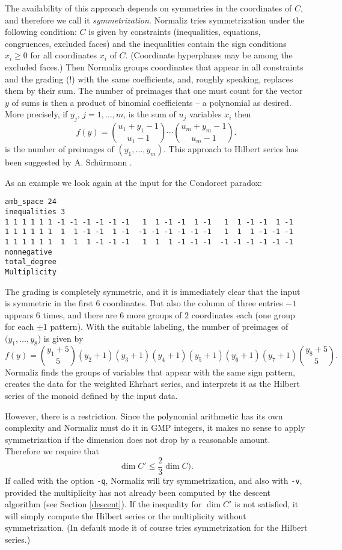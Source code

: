 \documentclass[12pt,a4paper]{scrartcl}
\theoremstyle{definition}
\begin{document}
{The availability of this approach depends on symmetries in the coordinates of $C$, and therefore we call it \emph{symmetrization}. Normaliz tries symmetrization under the following condition: $C$ is given by constraints (inequalities, equations, congruences, excluded faces) and the inequalities contain the sign conditions $x_i\ge 0$ for all coordinates  $x_i$ of $C$. (Coordinate hyperplanes may be among the excluded faces.) Then Normaliz groups coordinates that appear in all constraints and the grading (!) with the same coefficients, and, roughly speaking, replaces them by their sum. The number of preimages that one must count for the vector $y$  of sums is then a product of binomial coefficients -- a polynomial as desired. More precisely, if $y_j$, $j=1,\dots,m$, is the sum of  $u_j$ variables $x_i$ then
$$
f(y)=\binom{u_1+y_1-1}{u_1-1}\cdots \binom{u_m+y_m-1}{u_m-1}.
$$
is the number of preimages of $(y_1,\dots,y_m)$. This approach to Hilbert series has been suggested by A. Sch\"urmann \cite{Sch}.

As an example we look again at the input for the Condorcet paradox:
\begin{Verbatim}
amb_space 24
inequalities 3
1 1 1 1 1 1 -1 -1 -1 -1 -1 -1   1  1 -1 -1  1 -1   1  1 -1 -1  1 -1
1 1 1 1 1 1  1  1 -1 -1  1 -1  -1 -1 -1 -1 -1 -1   1  1  1 -1 -1 -1
1 1 1 1 1 1  1  1  1 -1 -1 -1   1  1  1 -1 -1 -1  -1 -1 -1 -1 -1 -1
nonnegative
total_degree
Multiplicity
\end{Verbatim}
The grading is completely symmetric, and it is immediately clear that the input is symmetric in the first $6$ coordinates. But also the column of three entries $-1$ appears $6$ times, and there are $6$ more groups of $2$ coordinates each (one group for each $\pm1$ pattern). With the suitable labeling, the number of preimages of$(y_1,\dots,y_8$) is given by
$$
f(y)=\binom{y_1+5}{5}(y_2+1)(y_3+1)(y_4+1)(y_5+1)(y_6+1)(y_7+1)\binom{y_8+5}{5}.
$$
Normaliz finds the groups of variables that appear with the same sign pattern, creates the data for the weighted Ehrhart series, and interprets it as the Hilbert series of the monoid defined by the input data. 

However, there is a restriction. Since the polynomial arithmetic has its own complexity and  Normaliz must do  it in GMP integers, it makes no sense to apply symmetrization if the dimension does not drop by a reasonable amount. Therefore we require that
$$
\dim C' \le \frac{2}{3}\dim C).
$$
If called with the option \verb|-q|,  Normaliz will try symmetrization, and also with \verb|-v|, provided the multiplicity has not already been computed by the descent algorithm (see Section \ref{descent}). If the inequality for $\dim C'$ is not satisfied, it will simply compute the Hilbert series or the multiplicity without symmetrization. (In default mode it of course tries symmetrization for the Hilbert series.)

}
\end{document}
